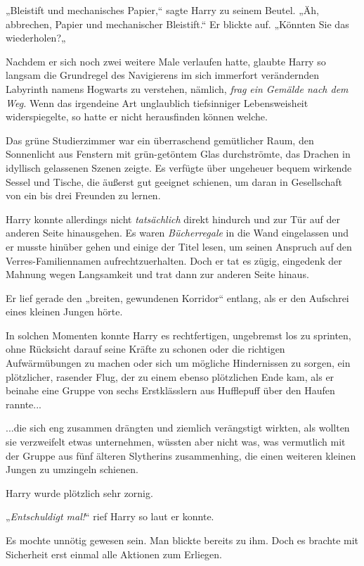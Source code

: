 {„Bleistift und mechanisches Papier,“ sagte Harry zu seinem Beutel. „Äh, abbrechen, Papier und mechanischer Bleistift.“ Er blickte auf. „Könnten Sie das wiederholen?„

Nachdem er sich noch zwei weitere Male verlaufen hatte, glaubte Harry so langsam die Grundregel des Navigierens im sich immerfort verändernden Labyrinth namens Hogwarts zu verstehen, nämlich, \emph{frag} \emph{ein Gemälde nach dem Weg.} Wenn das irgendeine Art unglaublich tiefsinniger Lebensweisheit widerspiegelte, so hatte er nicht herausfinden können welche.

Das grüne Studierzimmer war ein überraschend gemütlicher Raum, den Sonnenlicht aus Fenstern mit grün-getöntem Glas durchströmte, das Drachen in idyllisch gelassenen Szenen zeigte. Es verfügte über ungeheuer bequem wirkende Sessel und Tische, die äußerst gut geeignet schienen, um daran in Gesellschaft von ein bis drei Freunden zu lernen.

Harry konnte allerdings nicht \emph{tatsächlich} direkt hindurch und zur Tür auf der anderen Seite hinausgehen. Es waren \emph{Bücherregale} in die Wand eingelassen und er musste hinüber gehen und einige der Titel lesen, um seinen Anspruch auf den Verres-Familiennamen aufrechtzuerhalten. Doch er tat es zügig, eingedenk der Mahnung wegen Langsamkeit und trat dann zur anderen Seite hinaus.

Er lief gerade den „breiten, gewundenen Korridor“ entlang, als er den Aufschrei eines kleinen Jungen hörte.

In solchen Momenten konnte Harry es rechtfertigen, ungebremst los zu sprinten, ohne Rücksicht darauf seine Kräfte zu schonen oder die richtigen Aufwärmübungen zu machen oder sich um mögliche Hindernissen zu sorgen, ein plötzlicher, rasender Flug, der zu einem ebenso plötzlichen Ende kam, als er beinahe eine Gruppe von sechs Erstklässlern aus Hufflepuff über den Haufen rannte...

...die sich eng zusammen drängten und ziemlich verängstigt wirkten, als wollten sie verzweifelt etwas unternehmen, wüssten aber nicht was, was vermutlich mit der Gruppe aus fünf älteren Slytherins zusammenhing, die einen weiteren kleinen Jungen zu umzingeln schienen.

Harry wurde plötzlich sehr zornig.

„\emph{Entschuldigt mal!}“ rief Harry so laut er konnte.

Es mochte unnötig gewesen sein. Man blickte bereits zu ihm. Doch es brachte mit Sicherheit erst einmal alle Aktionen zum Erliegen.

}
